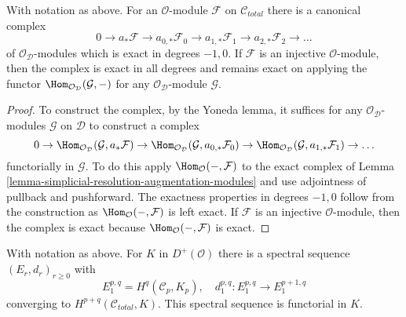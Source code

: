 \begin{lemma}
\label{lemma-augmentation-cech-complex-modules}
With notation as above.
For an $\mathcal{O}$-module $\mathcal{F}$ on $\mathcal{C}_{total}$
there is a canonical complex
$$
0 \to a_*\mathcal{F} \to a_{0, *}\mathcal{F}_0 \to a_{1, *}\mathcal{F}_1 \to
a_{2, *}\mathcal{F}_2 \to \ldots
$$
of $\mathcal{O}_\mathcal{D}$-modules which is exact in degrees $-1, 0$.
If $\mathcal{F}$ is an injective $\mathcal{O}$-module, then the complex
is exact in all degrees and remains exact on applying the functor
$\Hom_{\mathcal{O}_\mathcal{D}}(\mathcal{G}, -)$ for any
$\mathcal{O}_\mathcal{D}$-module $\mathcal{G}$.
\end{lemma}

\begin{proof}
To construct the complex, by the Yoneda lemma, it suffices for any
$\mathcal{O}_\mathcal{D}$-modules $\mathcal{G}$ on $\mathcal{D}$
to construct a complex
$$
0 \to \Hom_{\mathcal{O}_\mathcal{D}}(\mathcal{G}, a_*\mathcal{F}) \to
\Hom_{\mathcal{O}_\mathcal{D}}(\mathcal{G}, a_{0, *}\mathcal{F}_0) \to
\Hom_{\mathcal{O}_\mathcal{D}}(\mathcal{G}, a_{1, *}\mathcal{F}_1) \to \ldots
$$
functorially in $\mathcal{G}$. To do this apply
$\Hom_\mathcal{O}(-, \mathcal{F})$
to the exact complex of
Lemma \ref{lemma-simplicial-resolution-augmentation-modules}
and use adjointness of pullback and pushforward.
The exactness properties in degrees $-1, 0$ follow from
the construction as $\Hom_\mathcal{O}(-, \mathcal{F})$ is left exact.
If $\mathcal{F}$ is an injective $\mathcal{O}$-module, then the
complex is exact because $\Hom_\mathcal{O}(-, \mathcal{F})$ is exact.
\end{proof}

\begin{lemma}
\label{lemma-simplicial-module-cohomology-site}
With notation as above. For $K$ in $D^+(\mathcal{O})$
there is a spectral sequence $(E_r, d_r)_{r \geq 0}$ with
$$
E_1^{p, q} = H^q(\mathcal{C}_p, K_p),\quad
d_1^{p, q} : E_1^{p, q} \to E_1^{p + 1, q}
$$
converging to $H^{p + q}(\mathcal{C}_{total}, K)$.
This spectral sequence is functorial in $K$.
\end{lemma}

